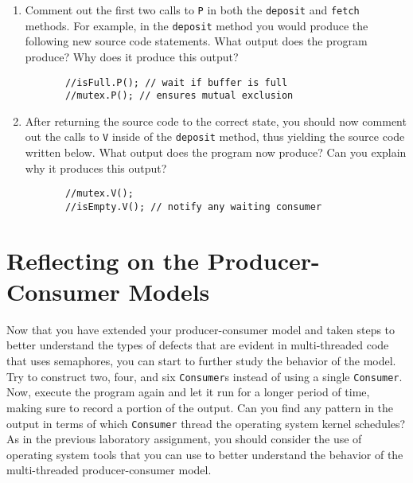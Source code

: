 \begin{enumerate} 
 
  \item Comment out the first two calls to {\tt P} in both the {\tt deposit} and {\tt fetch} methods.  For example, in
    the {\tt deposit} method you would produce the following new source code statements.  What output does the program
    produce?  Why does it produce this output?  

    \vspace*{-.1in}
    \begin{verbatim}
       //isFull.P(); // wait if buffer is full
       //mutex.P(); // ensures mutual exclusion
    \end{verbatim} 
    \vspace*{-.3in}

  \item After returning the source code to the correct state, you should now comment out the calls to {\tt V} inside of
    the {\tt deposit} method, thus yielding the source code written below. What output does the program now produce? Can
    you explain why it produces this output? 

    \vspace*{-.1in}
    \begin{verbatim}
       //mutex.V(); 
       //isEmpty.V(); // notify any waiting consumer
    \end{verbatim} 
    \vspace*{-.3in}

\end{enumerate}

\section*{Reflecting on the Producer-Consumer Models}

Now that you have extended your producer-consumer model and taken steps to better understand the types of defects that
are evident in multi-threaded code that uses semaphores, you can start to further study the behavior of the model.  Try
to construct two, four, and six {\tt Consumer}s instead of using a single {\tt Consumer}. Now, execute the program again
and let it run for a longer period of time, making sure to record a portion of the output. Can you find any pattern in
the output in terms of which {\tt Consumer} thread the operating system kernel schedules?  As in the previous laboratory
assignment, you should consider the use of operating system tools that you can use to better understand the behavior of
the multi-threaded producer-consumer model.


